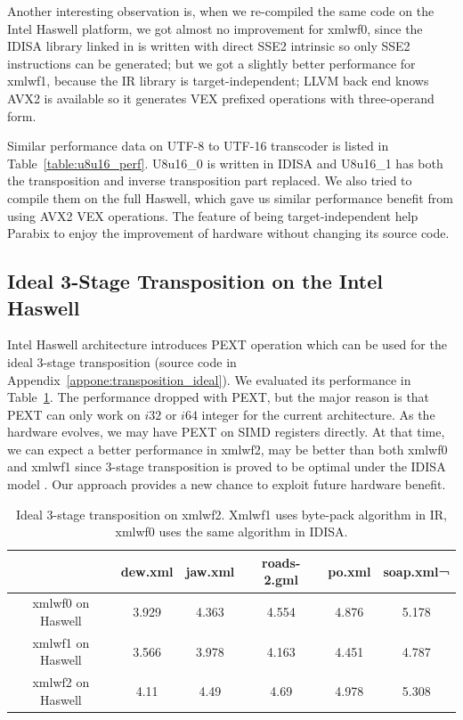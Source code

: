 Another interesting observation is, when we re-compiled the same code on the Intel Haswell platform, we got almost no improvement for xmlwf0, since the IDISA library linked in is written with direct SSE2 intrinsic so only SSE2 instructions can be generated; but we got a slightly better performance for xmlwf1, because the IR library is target-independent; LLVM back end knows AVX2 is available so it generates VEX prefixed operations with three-operand form.

Similar performance data on UTF-8 to UTF-16 transcoder is listed in Table~\ref{table:u8u16_perf}. U8u16\_0 is written in IDISA and U8u16\_1 has both the transposition and inverse transposition part replaced. We also tried to compile them on the full Haswell, which gave us similar performance benefit from using AVX2 VEX operations. The feature of being target-independent help Parabix to enjoy the improvement of hardware without changing its source code.

\subsection{Ideal 3-Stage Transposition on the Intel Haswell}
Intel Haswell architecture introduces PEXT operation which can be used for the ideal 3-stage transposition (source code in Appendix~\ref{appone:transposition_ideal}). We evaluated its performance in Table~\ref{table:PEXT_transposition}. The performance dropped with PEXT, but the major reason is that PEXT can only work on $i32$ or $i64$ integer for the current architecture. As the hardware evolves, we may have PEXT on SIMD registers directly. At that time, we can expect a better performance in xmlwf2, may be better than both xmlwf0 and xmlwf1 since 3-stage transposition is proved to be optimal under the IDISA model \cite{inductive_doubling_principle}. Our approach provides a new chance to exploit future hardware benefit.

\begin{table}[h]
\centering
\begin{tabular}{|c|c|c|c|c|c|}
\hline
        & dew.xml  &  jaw.xml  &  roads-2.gml  &  po.xml  & soap.xml¬ \\\hline
xmlwf0 on Haswell   &  3.929   &   4.363   &   4.554   &   4.876   &   5.178 \\ \hline
xmlwf1 on Haswell &   3.566   &   3.978   &   4.163   &   4.451   &   4.787 \\ \hline
xmlwf2 on Haswell & 4.11   &    4.49   &    4.69   &    4.978   &   5.308 \\ \hline
\end{tabular}
\caption[Ideal 3-Stage Transposition with PEXT]{Ideal 3-stage transposition on xmlwf2. Xmlwf1 uses byte-pack algorithm in IR, xmlwf0 uses the same algorithm in IDISA.}
\label{table:PEXT_transposition}
\end{table}

